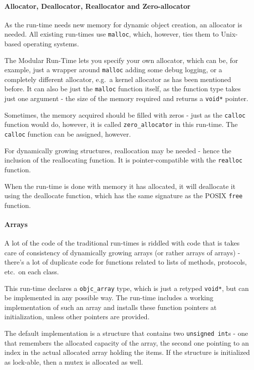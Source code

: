 \paragraph{Allocator, Deallocator, Reallocator and Zero-allocator}

As the run-time needs new memory for dynamic object creation, an allocator is needed. All existing run-times use \verb=malloc=, which, however, ties them to Unix-based operating systems.

The Modular Run-Time lets you specify your own allocator, which can be, for example, just a wrapper around \verb=malloc= adding some debug logging, or a completely different allocator, e.g.\ a kernel allocator as has been mentioned before. It can also be just the \verb=malloc= function itself, as the function type takes just one argument - the size of the memory required and returns a \verb=void*= pointer.

Sometimes, the memory acquired should be filled with zeros - just as the \verb=calloc= function would do, however, it is called \verb=zero_allocator= in this run-time. The \verb=calloc= function can be assigned, however.

For dynamically growing structures, reallocation may be needed - hence the inclusion of the reallocating function. It is pointer-compatible with the \verb=realloc= function.

When the run-time is done with memory it has allocated, it will deallocate it using the deallocate function, which has the same signature as the POSIX \verb=free= function.

\paragraph{Arrays}

A lot of the code of the traditional run-times is riddled with code that is takes care of consistency of dynamically growing arrays (or rather arrays of arrays) - there's a lot of duplicate code for functions related to lists of methods, protocols, etc.\ on each class.

This run-time declares a \verb=objc_array= type, which is just a retyped \verb=void*=, but can be implemented in any possible way. The run-time includes a working implementation of such an array and installs these function pointers at initialization, unless other pointers are provided.

The default implementation is a structure that contains two \verb=unsigned int=s - one that remembers the allocated capacity of the array, the second one pointing to an index in the actual allocated array holding the items. If the structure is initialized as lock-able, then a mutex is allocated as well.


